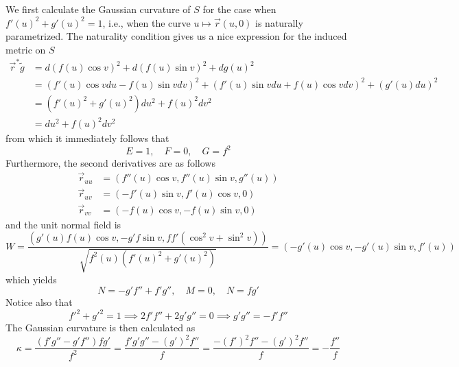 \documentclass[a4paper, 12pt]{article}
\begin{document}
\begin{Exercise}
\begin{enumerate}[label=(\roman*)]
            We first calculate the Gaussian curvature of $S$ for the case when $f'(u)^2 + g'(u)^2 = 1$,
            i.e., when the curve $u \mapsto \vec{r}(u, 0)$ is naturally parametrized.
            The naturality condition gives us a nice expression for the induced metric on $S$
            \begin{align*}
                \vec{r}^*\tilde{g}
                &= d(f(u)\cos v)^2 + d(f(u)\sin v)^2 + dg(u)^2 \\
                &= (f'(u)\cos v du - f(u)\sin v dv)^2 + (f'(u)\sin v du + f(u)\cos v dv)^2 + (g'(u)du)^2 \\
                &= (f'(u)^2 + g'(u)^2)du^2 + f(u)^2dv^2 \\
                &= du^2 + f(u)^2dv^2
            \end{align*}
            from which it immediately follows that
            \[
                E = 1,\quad F = 0,\quad G = f^2
            \]
            Furthermore, the second derivatives are as follows
            \begin{align*}
                \vec{r}_{uu} &= (f''(u)\cos v, f''(u)\sin v, g''(u)) \\
                \vec{r}_{uv} &= (-f'(u)\sin v, f'(u)\cos v, 0) \\
                \vec{r}_{vv} &= (-f(u)\cos v, -f(u) \sin v, 0)
            \end{align*}
            and the unit normal field is
            \[
                W
                = \frac{(g'(u)f(u)\cos v, -g'f\sin v, f f' (\cos^2 v + \sin^2 v))}{\sqrt{f^2(u)(f'(u)^2 + g'(u)^2)}}
                = (-g'(u)\cos v, -g'(u)\sin v, f'(u))
            \]
            which yields
            \[
                N = -g'f'' + f'g'',\quad M = 0,\quad N = fg'
            \]
            Notice also that
            \[
                f'^2 + g'^2 = 1
                \implies 2f'f'' + 2g'g'' = 0
                \implies g'g'' = -f'f''
            \]
            The Gaussian curvature is then calculated as
            \[
                \kappa
                = \frac{(f'g'' - g'f'')fg'}{f^2}
                = \frac{f'g'g'' - (g')^2f''}{f}
                = \frac{-(f')^2f'' - (g')^2f''}{f}
                = - \frac{f''}{f}
            \]
            

\end{enumerate}
\end{Exercise}
\end{document}
